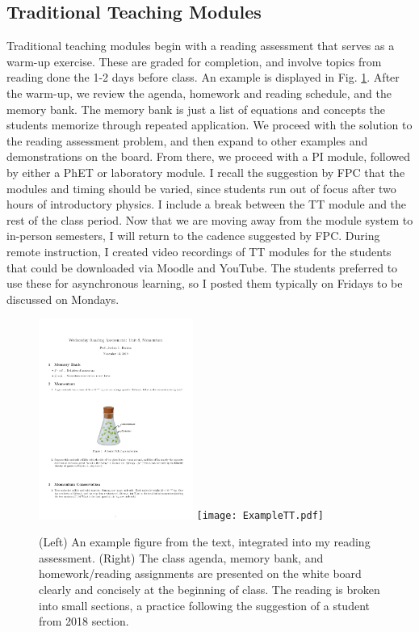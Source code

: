 \documentclass[../../../main.tex]{subfiles}
\begin{document}
\subsection{Traditional Teaching Modules}
\label{sec:tt}

Traditional teaching modules begin with a reading assessment that serves as a warm-up exercise.  These are graded for completion, and involve topics from reading done the 1-2 days before class.  An example is displayed in Fig. \ref{fig:read}.  After the warm-up, we review the agenda, homework and reading schedule, and the memory bank.  The memory bank is just a list of equations and concepts the students memorize through repeated application.  We proceed with the solution to the reading assessment problem, and then expand to other examples and demonstrations on the board.  From there, we proceed with a PI module, followed by either a PhET or laboratory module.  I recall the suggestion by FPC that the modules and timing should be varied, since students run out of focus after two hours of introductory physics.  I include a break between the TT module and the rest of the class period.  Now that we are moving away from the module system to in-person semesters, I will return to the cadence suggested by FPC.  During remote instruction, I created video recordings of TT modules for the students that could be downloaded via Moodle and YouTube.  The students preferred to use these for asynchronous learning, so I posted them typically on Fridays to be discussed on Mondays.

\begin{figure}
\centering
\includegraphics[width=0.45\textwidth]{figures/readingassessment.png}
\texttt{[image: ExampleTT.pdf]}
\caption{\label{fig:read} (Left) An example figure from the text, integrated into my reading assessment.  (Right) The class agenda, memory bank, and homework/reading assignments are presented on the white board clearly and concisely at the beginning of class.  The reading is broken into small sections, a practice following the suggestion of a student from 2018 section.}
\end{figure}
\end{document}
